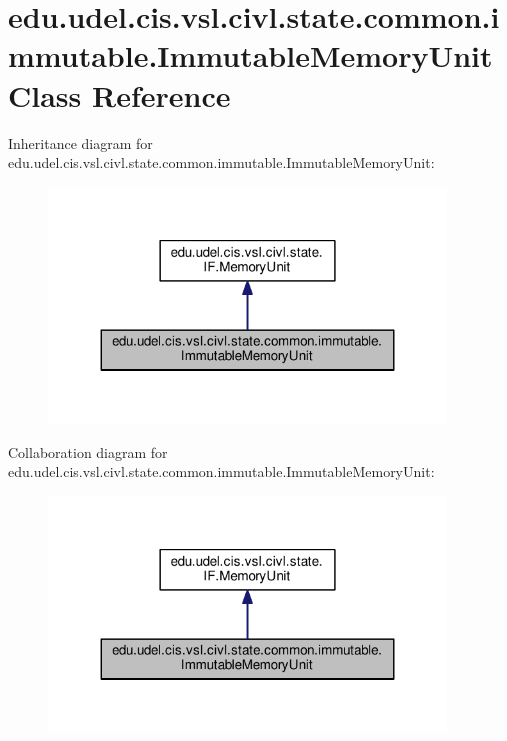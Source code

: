 \hypertarget{classedu_1_1udel_1_1cis_1_1vsl_1_1civl_1_1state_1_1common_1_1immutable_1_1ImmutableMemoryUnit}{}\section{edu.\+udel.\+cis.\+vsl.\+civl.\+state.\+common.\+immutable.\+Immutable\+Memory\+Unit Class Reference}
\label{classedu_1_1udel_1_1cis_1_1vsl_1_1civl_1_1state_1_1common_1_1immutable_1_1ImmutableMemoryUnit}


Inheritance diagram for edu.\+udel.\+cis.\+vsl.\+civl.\+state.\+common.\+immutable.\+Immutable\+Memory\+Unit\+:
\nopagebreak
\begin{figure}[H]
\begin{center}
\leavevmode
\includegraphics[width=299pt]{classedu_1_1udel_1_1cis_1_1vsl_1_1civl_1_1state_1_1common_1_1immutable_1_1ImmutableMemoryUnit__inherit__graph}
\end{center}
\end{figure}


Collaboration diagram for edu.\+udel.\+cis.\+vsl.\+civl.\+state.\+common.\+immutable.\+Immutable\+Memory\+Unit\+:
\nopagebreak
\begin{figure}[H]
\begin{center}
\leavevmode
\includegraphics[width=299pt]{classedu_1_1udel_1_1cis_1_1vsl_1_1civl_1_1state_1_1common_1_1immutable_1_1ImmutableMemoryUnit__coll__graph}
\end{center}
\end{figure}
